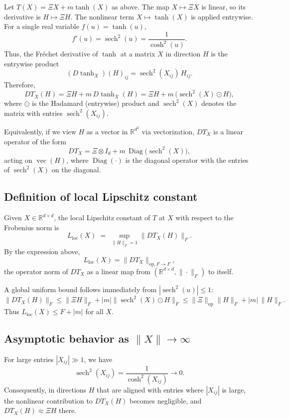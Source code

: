 \documentclass[11pt]{article}
\begin{document}
Let $T(X) = \Xi X + m\tanh(X)$ as above. The map $X\mapsto \Xi X$ is linear, so its derivative is $H\mapsto \Xi H$. The nonlinear term $X\mapsto \tanh(X)$ is applied entrywise. For a single real variable $f(u)=\tanh(u)$,
\[
  f'(u) = \operatorname{sech}^2(u) = \frac{1}{\cosh^2(u)}.
\]
Thus, the Fr\'echet derivative of $\tanh$ at a matrix $X$ in direction $H$ is the entrywise product
\[
  (D\tanh_X)(H)_{ij} = \operatorname{sech}^2(X_{ij})\,H_{ij}.
\]
Therefore,
\[
  DT_X(H) = \Xi H + m\,D\tanh_X(H)
         = \Xi H + m\,\bigl(\operatorname{sech}^2(X)\odot H\bigr),
\]
where $\odot$ is the Hadamard (entrywise) product and $\operatorname{sech}^2(X)$ denotes the matrix with entries $\operatorname{sech}^2(X_{ij})$.

Equivalently, if we view $H$ as a vector in $\mathbb{R}^{d^2}$ via vectorization, $DT_X$ is a linear operator of the form
\[
  DT_X = \Xi\otimes I_d + m\,\operatorname{Diag}\bigl(\operatorname{sech}^2(X)\bigr),
\]
acting on $\operatorname{vec}(H)$, where $\operatorname{Diag}(\cdot)$ is the diagonal operator with the entries of $\operatorname{sech}^2(X)$ on the diagonal.

\subsection{Definition of local Lipschitz constant}

Given $X\in\mathbb{R}^{d\times d}$, the local Lipschitz constant of $T$ at $X$ with respect to the Frobenius norm is
\[
  L_{\mathrm{loc}}(X) \;=\; \sup_{\|H\|_F=1} \|DT_X(H)\|_F.
\]
By the expression above,
\[
  L_{\mathrm{loc}}(X) = \|DT_X\|_{\mathrm{op},F\to F},
\]
the operator norm of $DT_X$ as a linear map from $(\mathbb{R}^{d\times d},\|\cdot\|_F)$ to itself.

A global uniform bound follows immediately from $|\operatorname{sech}^2(u)|\le 1$:
\[
  \|DT_X(H)\|_F \le \|\Xi H\|_F + |m|\|\operatorname{sech}^2(X)\odot H\|_F
  \le \|\Xi\|_{\mathrm{op}}\|H\|_F + |m|\,\|H\|_F.
\]
Thus $L_{\mathrm{loc}}(X)\le F+|m|$ for all $X$.

\subsection{Asymptotic behavior as $\|X\|\to\infty$}

For large entries $|X_{ij}|\gg 1$, we have
\[
  \operatorname{sech}^2(X_{ij}) = \frac{1}{\cosh^2(X_{ij})} \to 0.
\]
Consequently, in directions $H$ that are aligned with entries where $|X_{ij}|$ is large, the nonlinear contribution to $DT_X(H)$ becomes negligible, and $DT_X(H)\approx \Xi H$ there.
\end{document}

